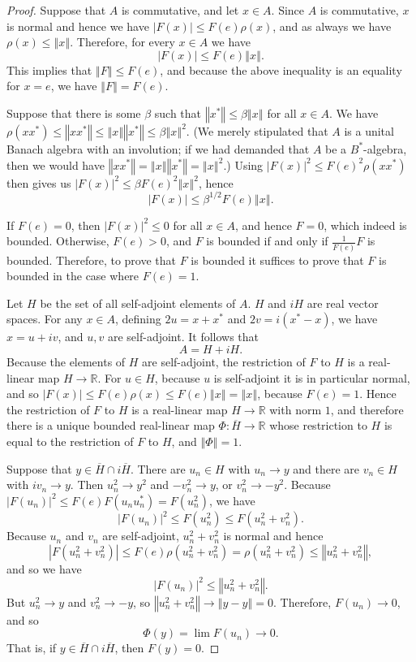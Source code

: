 \documentclass{article}
\newcommand{\norm}[1]{\left\Vert #1 \right\Vert}
\theoremstyle{definition}
\theoremstyle{definition}
\begin{document}
\begin{proof}
Suppose that $A$ is commutative, and let $x \in A$. Since $A$ is commutative, $x$ is normal and hence
we have $|F(x)| \leq F(e) \rho(x)$, and as always we have $\rho(x) \leq \norm{x}$.
Therefore, for every $x \in A$ we have
\[
|F(x)| \leq F(e) \norm{x}.
\]
This implies that $\norm{F} \leq F(e)$, and because the above inequality is an equality for $x=e$, we have
$\norm{F}=F(e)$. 

Suppose that there is some $\beta$ such that $\norm{x^*} \leq \beta \norm{x}$ for all $x \in A$. We have
$\rho(xx^*) \leq \norm{xx^*} \leq  \norm{x} \norm{x^*} \leq \beta \norm{x}^2$. (We merely stipulated that $A$ is a  unital Banach algebra
with an involution; if we had demanded that $A$ be a $B^*$-algebra, then we would have $\norm{xx^*}=\norm{x}\norm{x^*}=\norm{x}^2$.)
Using $|F(x)|^2 \leq F(e)^2 \rho(xx^*)$ then gives us $|F(x)|^2 \leq \beta F(e)^2 \norm{x}^2$, hence
\[
|F(x)| \leq \beta^{1/2} F(e) \norm{x}.
\]

If $F(e)=0$, then $|F(x)|^2 \leq 0$ for all $x \in A$, and hence $F=0$, which indeed is bounded.
Otherwise, $F(e)>0$, and $F$ is bounded if and only if $\frac{1}{F(e)}F$ is bounded.
Therefore, to prove that $F$ is bounded it suffices to prove that $F$ is bounded in the case where
$F(e)=1$.

Let $H$ be the set of all self-adjoint elements of $A$. $H$ and $iH$ are real vector spaces.
For any $x \in A$, defining $2u=x+x^*$ and $2v=i(x^*-x)$, we have $x=u+iv$, and $u,v$ are self-adjoint. It follows that
\[
A=H+iH.
\]
Because the elements
of $H$ are self-adjoint, the restriction of $F$ to $H$ is a real-linear map $H \to \mathbb{R}$.
For $u \in H$, because $u$ is self-adjoint it is in particular normal, and so $|F(x)| \leq F(e) \rho(x) \leq F(e) \norm{x} = \norm{x}$, because $F(e)=1$.  Hence
the restriction of $F$ to $H$ is a real-linear map $H \to \mathbb{R}$ with norm $1$, and therefore there is a unique bounded real-linear map $\Phi:\overline{H} \to \mathbb{R}$ whose restriction to $H$ is equal to the restriction of $F$ to $H$, and $\norm{\Phi}=1$.

Suppose that $y \in \overline{H} \cap i\overline{H}$. There are $u_n \in H$ with $u_n \to y$ and there are $v_n \in H$ with
$iv_n \to y$. Then $u_n^2 \to y^2$ and $-v_n^2 \to y$, or $v_n^2 \to -y^2$. Because $|F(u_n)|^2 \leq F(e)F(u_nu_n^*)=
F(u_n^2)$, we have 
\[
|F(u_n)|^2 \leq F(u_n^2) \leq F(u_n^2+v_n^2).
\]
Because $u_n$ and $v_n$ are self-adjoint, $u_n^2+v_n^2$ is normal and hence
\[
|F(u_n^2+v_n^2)| \leq F(e)\rho(u_n^2+v_n^2) = \rho(u_n^2+v_n^2) \leq \norm{u_n^2+v_n^2},
\]
and so we have
\[
|F(u_n)|^2 \leq \norm{u_n^2+v_n^2}.
\]
But $u_n^2 \to y$ and $v_n^2 \to -y$, so $\norm{u_n^2+v_n^2} \to \norm{y-y}=0$. Therefore, $F(u_n) \to 0$, and so
\[
\Phi(y) = \lim F(u_n) \to 0.
\]
That is, if $y \in \overline{H} \cap i\overline{H}$, then $F(y)=0$.


\end{proof}
\end{document}
